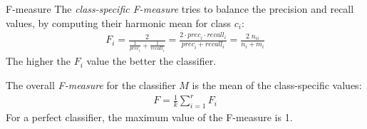 \begin{frame}{F-measure} 
The {\em class-specif\/{i}c
F-measure} tries to balance the precision and recall values, by
computing their harmonic mean for class $c_i$:
\begin{align*}
  F_i = \frac{2}{\frac{1}{\textit{prec}_i} + \frac{1}{\textit{recall}_i}} =
  \frac{2 \cdot \textit{prec}_i \cdot \textit{recall}_i}{\textit{prec}_i + \textit{recall}_i} =
  \frac{2 \; n_{ii}}{n_{i} + m_{i}}
\end{align*}
The higher the $F_i$ value the better the classif\/{i}er.

\medskip
The overall {\em F-measure} for the classif\/{i}er $M$ is the mean of
the class-specif\/{i}c values:
\begin{align*}
  F = \frac{1}{k} \sum_{i=1}^r F_i
\end{align*}
For a perfect classif\/{i}er, the maximum value of the F-measure is 1.
\end{frame}



